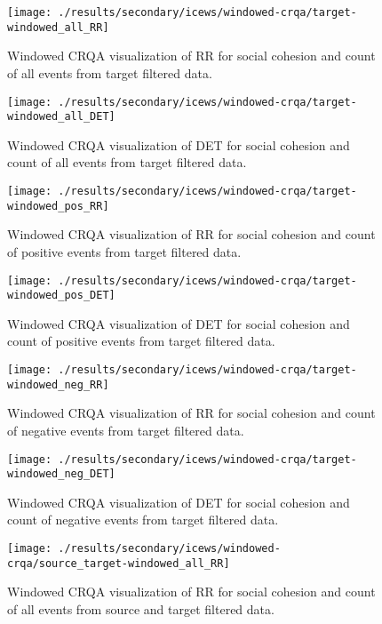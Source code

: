 \documentclass[english,man]{apa6}
\begin{document}
\begin{appendix}
\begin{figure}[H]
\texttt{[image: ./results/secondary/icews/windowed-crqa/target-windowed\_all\_RR]} \caption{Windowed CRQA visualization of RR for social cohesion and count of all events from target filtered data.}\label{fig:plot-RR-targ-all-secondary-icews}
\end{figure}
\begin{figure}[H]
\texttt{[image: ./results/secondary/icews/windowed-crqa/target-windowed\_all\_DET]} \caption{Windowed CRQA visualization of DET for social cohesion and count of all events from target filtered data.}\label{fig:plot-DET-targ-all-secondary-icews}
\end{figure}
\begin{figure}[H]
\texttt{[image: ./results/secondary/icews/windowed-crqa/target-windowed\_pos\_RR]} \caption{Windowed CRQA visualization of RR for social cohesion and count of positive events from target filtered data.}\label{fig:plot-RR-targ-pos-secondary-icews}
\end{figure}
\begin{figure}[H]
\texttt{[image: ./results/secondary/icews/windowed-crqa/target-windowed\_pos\_DET]} \caption{Windowed CRQA visualization of DET for social cohesion and count of positive events from target filtered data.}\label{fig:plot-DET-targ-pos-secondary-icews}
\end{figure}
\begin{figure}[H]
\texttt{[image: ./results/secondary/icews/windowed-crqa/target-windowed\_neg\_RR]} \caption{Windowed CRQA visualization of RR for social cohesion and count of negative events from target filtered data.}\label{fig:plot-RR-targ-neg-secondary-icews}
\end{figure}
\begin{figure}[H]
\texttt{[image: ./results/secondary/icews/windowed-crqa/target-windowed\_neg\_DET]} \caption{Windowed CRQA visualization of DET for social cohesion and count of negative events from target filtered data.}\label{fig:plot-DET-targ-neg-secondary-icews}
\end{figure}
\begin{figure}[H]
\texttt{[image: ./results/secondary/icews/windowed-crqa/source\_target-windowed\_all\_RR]} \caption{Windowed CRQA visualization of RR for social cohesion and count of all events from source and target filtered data.}\label{fig:plot-RR-source-targ-all-secondary-icews}

\end{figure}
\end{appendix}
\end{document}
